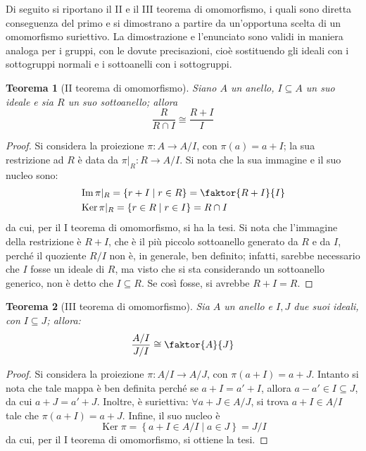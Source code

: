 \documentclass[11pt]{article}
\theoremstyle{style}
\newtheorem{teorema}{Teorema}[section]
\numberwithin{equation}{subsection}
\begin{document}
\noindent Di seguito si riportano il II e il III teorema di omomorfismo, i quali sono diretta conseguenza del primo e si dimostrano a partire da un'opportuna scelta di un omomorfismo suriettivo.
La dimostrazione e l'enunciato sono validi in maniera analoga per i gruppi, con le dovute precisazioni, cio\`e sostituendo gli ideali con i sottogruppi normali e i sottoanelli con i sottogruppi.
\begin{teorema}
	[II teorema di omomorfismo]
	Siano $A$ un anello, $I\subseteq A$ un suo ideale e sia $R$ un suo sottoanello; allora 
	\[
	 \frac{R}{R\cap I}\cong\frac{R+I}{I}
	\] 
\end{teorema}
	\begin{proof}
		Si considera la proiezione $\pi : A \to A / I$, con $\pi(a) = a + I$; la sua restrizione ad $R$ \`e data da $\pi|_R : R \to A / I$.
		Si nota che la sua immagine e il suo nucleo sono: 
		\[
			\begin{split}
				&\operatorname{Im} \pi|_R = \left\{ r + I  \mid r \in R \right\} = \faktor{R+I}{I}\\
				&\operatorname{Ker} \pi|_R = \left\{ r \in R  \mid r \in I \right\}  = R \cap I 
			\end{split}
		\] 
		da cui, per il I teorema di omomorfismo, si ha la tesi.
		Si nota che l'immagine della restrizione \`e $R+I$, che \`e il pi\`u piccolo sottoanello generato da $R$ e da $I$, perch\'e il quoziente $R / I$ non \`e, in generale, ben definito; infatti, sarebbe necessario che $I$ fosse un ideale di $R$, ma visto che si sta considerando un sottoanello generico, non \`e detto che $I \subseteq R$. 
		Se cos\`i fosse, si avrebbe $R + I = R$.
	\end{proof}
\begin{teorema}
	[III teorema di omomorfismo]
	Sia $A $ un anello e $I,J$ due suoi ideali, con $I \subseteq J$; allora:
	\[
		\frac{A / I }{J / I}\cong \faktor{A}{J}
	\] 
\end{teorema}
	\begin{proof}
		Si considera la proiezione $\pi : A / I \to A / J$, con $\pi(a+ I) = a + J $.
	Intanto si nota che tale mappa \`e ben definita perch\'e se $a + I = a' + I$, allora $a-a' \in I \subseteq J$, da cui $a + J = a'+ J$.
Inoltre, \`e suriettiva: $\forall a + J \in A / J$, si trova $a +I \in A / I$ tale che $\pi(a+I) = a + J$.
Infine, il suo nucleo \`e 
\[
\operatorname{Ker} \pi = \left\{ a+ I \in A / I  \mid a \in J \right\} = J / I
\] 
da cui, per il I teorema di omomorfismo, si ottiene la tesi.
	\end{proof}
\end{document}
